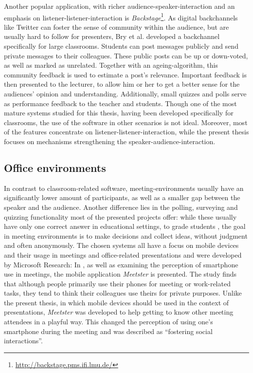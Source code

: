 Another popular application, with richer audience-spea\-ker-in\-ter\-ac\-tion and an emphasis on listener-listener-interaction is \emph{Backstage}\footnote{\url{http://backstage.pms.ifi.lmu.de/}}. As digital backchannels like Twitter can foster the sense of community within the audience, but are usually hard to follow for presenters, Bry et al.\cite{Bry:Backstage} developed a backchannel specifically for large classrooms. Students can post messages publicly and send private messages to their colleagues. These public posts can be up or down-voted, as well as marked as unrelated. Together with an ageing-algorithm, this community feedback is used to estimate a post's relevance. Important feedback is then presented to the lecturer, to allow him or her to get a better sense for the audiences' opinion and understanding. Additionally, small quizzes and polls serve as performance feedback to the teacher and students. Though one of the most mature systems studied for this thesis, having been developed specifically for classrooms, the use of the software in other scenarios is not ideal. Moreover, most of the features concentrate on listener-listener-interaction, while the present thesis focuses on mechanisms strengthening the speaker-audience-interaction.

\subsection{Office environments}

In contrast to classroom-related software, meeting-en\-vi\-ron\-ments usually have an significantly lower amount of participants, as well as a smaller gap between the speaker and the audience. Another difference lies in the polling, surveying and quizzing functionality most of the presented projects offer: while these usually have only one correct answer in educational settings, to grade students \cite{Lindquist:ExploringMobilePhonesActiveLearning, Triglianos:InteractiveWebPresentationsImpress, Bry:Backstage}, the goal in meeting environments is to make decisions and collect ideas, without judgment and often anonymously.
The chosen systems all have a focus on mobile devices and their usage in meetings and office-related presentations and were developed by Microsoft Research: In \cite{Bohmer:SmartphoneUseRude}, as well as examining the perception of smartphone use in meetings, the mobile application \emph{Meetster} is presented. The study finds that although people primarily use their phones for meeting or work-related tasks, they tend to think their colleagues use theirs for private purposes. Unlike the present thesis, in which mobile devices should be used in the context of presentations, \emph{Meetster} was developed to help getting to know other meeting attendees in a playful way. This changed the perception of using one's smartphone during the meeting and was described as ``fostering social interactions''.

